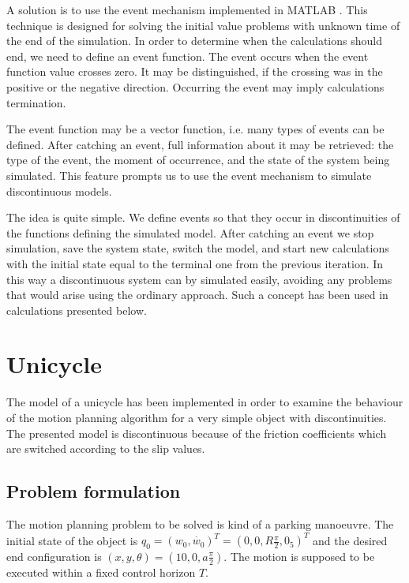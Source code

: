 A solution is to use the event mechanism implemented in MATLAB \cite{events}.
This technique is designed for solving the initial value problems with unknown time of
the end of the simulation. In order to determine when the calculations should end,
we need to define an event function. The event occurs when the event function value
crosses zero. It may be distinguished, if the crossing was in the positive or the negative direction.
Occurring the event may imply calculations termination. 

The event function may be a vector function, i.e. many types of events can be defined. After catching
an event, full information about it may be retrieved: the type of the event, the moment of occurrence,
and the state of the system being simulated. This feature prompts us to use the event mechanism
to simulate discontinuous models.

The idea is quite simple. We define events so that they occur in discontinuities of the
functions defining the simulated model. After catching
an event we stop simulation, save the system state, switch the model, and start new
calculations with the initial state equal to the terminal one from the previous iteration.
In this way a discontinuous system can by simulated easily, avoiding any problems that would
arise using the ordinary approach. Such a concept has been used in calculations presented below.


\section{Unicycle}
The model of a unicycle has been implemented in order to examine the behaviour
of the motion planning algorithm for a very simple object with discontinuities.
The presented model is discontinuous because of the friction coefficients
which are switched according to the slip values.

\subsection{Problem formulation}
The motion planning problem to be solved is kind of a parking manoeuvre. The initial
state of the object is $q_0 = (w_0, \dot{w_0})^T = (0, 0, R\frac{\pi}{2}, 0_5)^T$
and the desired end configuration is $(x, y, \theta) = (10, 0, a\frac{\pi}{2})$.
The motion is supposed to be executed within a fixed control horizon $T$.

